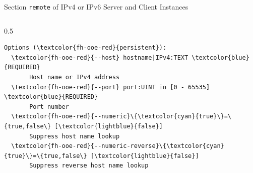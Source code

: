 \begin{frame}[fragile]{Section \alert{\lstinline|remote|} of IPv4 or IPv6 Server and Client Instances}
\begin{columns}[T, onlytextwidth]
\begin{column}{0.5\textwidth}
\begin{scriptsize}
\begin{Verbatim}[commandchars=\\\{\},frame=leftline,rulecolor=\color{fh-ooe-red}]
Options (\textcolor{fh-ooe-red}{persistent}):
  \textcolor{fh-ooe-red}{--host} hostname|IPv4:TEXT \textcolor{blue}{REQUIRED}
       Host name or IPv4 address
  \textcolor{fh-ooe-red}{--port} port:UINT in [0 - 65535] \textcolor{blue}{REQUIRED}
       Port number
  \textcolor{fh-ooe-red}{--numeric}\{\textcolor{cyan}{true}\}=\{true,false\} [\textcolor{lightblue}{false}]
       Suppress host name lookup
  \textcolor{fh-ooe-red}{--numeric-reverse}\{\textcolor{cyan}{true}\}=\{true,false\} [\textcolor{lightblue}{false}]
       Suppress reverse host name lookup
\end{Verbatim}
\end{scriptsize}
\end{column}
\end{columns}
\end{frame}

